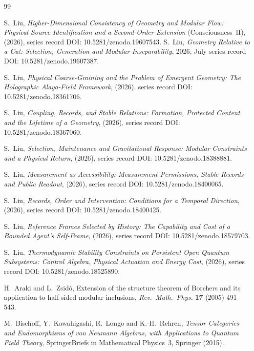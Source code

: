 \documentclass[12pt]{article}
\theoremstyle{definition}
\theoremstyle{remark}
\begin{document}
\begin{thebibliography}{99}

S.~Liu, \emph{Higher-Dimensional Consistency of Geometry and Modular Flow: Physical Source Identification and a Second-Order Extension} (Consciousness~II), (2026), series record DOI: 10.5281/zenodo.19607543.
S.~Liu, \emph{Geometry Relative to a Cut: Selection, Generation and Modular
Inseparability}, 2026, July series record DOI:
10.5281/zenodo.19607387.

S.~Liu, \emph{Physical Coarse-Graining and the Problem of Emergent Geometry: The Holographic Alaya-Field Framework}, (2026), series record DOI:
10.5281/zenodo.18361706.

S.~Liu, \emph{Coupling, Records, and Stable Relations:
Formation, Protected Content and the Lifetime of a Geometry}, (2026), series record
DOI: 10.5281/zenodo.18367060.

S.~Liu, \emph{Selection, Maintenance and Gravitational Response: Modular Constraints and a Physical Return}, (2026), series
record DOI: 10.5281/zenodo.18388881.

S.~Liu, \emph{Measurement as Accessibility: Measurement Permissions, Stable Records and
Public Readout}, (2026), series record DOI: 10.5281/zenodo.18400065.

S.~Liu, \emph{Records, Order and Intervention: Conditions for a Temporal Direction}, (2026), series record DOI: 10.5281/zenodo.18400425.

S.~Liu, \emph{Reference Frames Selected by History: The Capability and Cost of a Bounded
Agent's Self-Frame}, (2026), series record DOI: 10.5281/zenodo.18579703.

S.~Liu, \emph{Thermodynamic Stability Constraints on Persistent Open Quantum Subsystems:
Control Algebra, Physical Actuation and Energy Cost}, (2026), series
record DOI: 10.5281/zenodo.18525890.

H.~Araki and L.~Zsid\'o, Extension of the structure theorem of Borchers and its
application to half-sided modular inclusions, \emph{Rev.\ Math.\ Phys.} \textbf{17}
(2005) 491--543.

M.~Bischoff, Y.~Kawahigashi, R.~Longo and K.-H.~Rehren, \emph{Tensor Categories and
Endomorphisms of von Neumann Algebras, with Applications to Quantum Field Theory},
SpringerBriefs in Mathematical Physics~3, Springer (2015).


\end{thebibliography}
\end{document}
